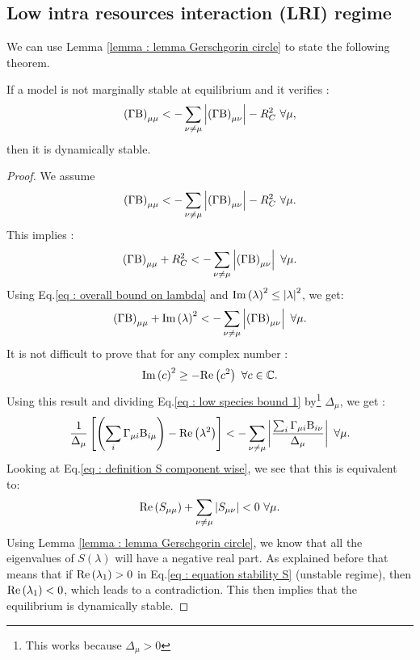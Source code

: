 \documentclass[12pt]{report}
\begin{document}
\subsection{Low intra resources interaction (LRI) regime }
We can use Lemma \ref{lemma : lemma Gerschgorin circle} to state the following theorem.
\begin{theorem}
If a model is not marginally stable at equilibrium and it verifies :
\begin{equation}\label{eq : LRI regime}
\left(\Gamma \text{B}\right)_{\mu\mu} < - \sum_{\nu \neq \mu } \left|{\left(\Gamma \text{B}\right)_{\mu \nu}}\right| - R_C^2 \ \forall \mu,
\end{equation}
then it is dynamically stable.
\end{theorem}
\begin{proof}
We assume
\begin{equation}
\left(\Gamma \text{B}\right)_{\mu\mu} < - \sum_{\nu \neq \mu } \left|{\left(\Gamma \text{B}\right)_{\mu \nu}}\right| -R_C^2 \ \forall \mu.
\end{equation}
This implies :
\begin{equation}
\left(\Gamma \text{B}\right)_{\mu\mu} + R_C^2< - \sum_{\nu \neq \mu } \left|{\left(\Gamma \text{B}\right)_{\mu \nu}}\right| \ \forall \mu.
\end{equation}
Using Eq.\eqref{eq : overall bound on lambda} and $\text{Im}\left(\lambda\right)^2 \leq \left|{\lambda}\right|^2$, we get:
\begin{equation}
  \left(\Gamma\text{B} \right)_{\mu\mu} + \text{Im}\left(\lambda\right)^2 < - \sum_{\nu \neq \mu } \left|{\left(\Gamma \text{B}\right)_{\mu \nu}}\right| \ \forall \mu. \label{eq : low species bound 1}
\end{equation}
It is not difficult to prove that for any complex number :
\begin{equation}
\text{Im}\left(c\right)^2 \geq - \text{Re}\left(c^2\right) \ \forall c \in \mathbb{C}.
\end{equation}
Using this result and dividing Eq.\eqref{eq : low species bound 1} by\footnote{This works because $\Delta_\mu > 0$} $\Delta_\mu$, we get :
\begin{equation}
\frac{1}{\Delta_\mu}\left[\left(\sum_i \Gamma_{\mu i} \text{B}_{i \mu} \right)-\text{Re}\left(\lambda^2\right)\right] < - \sum_{\nu \neq \mu } \left|{\frac{\sum_i \Gamma_{\mu i}\text{B}_{i\nu}}{\Delta_\mu}}\right| \ \forall \mu.
\end{equation}
Looking at Eq.\eqref{eq : definition S component wise}, we see that this is equivalent to:
\begin{equation}
\text{Re}\left(S_{\mu \mu}\right) + \sum_{\nu \neq \mu} \left|{S_{\mu \nu}}\right| < 0\ \forall \mu.
\end{equation}
Using Lemma \ref{lemma : lemma Gerschgorin circle}, we know that all the eigenvalues of $S(\lambda)$ will have a negative real part.
As explained before that means that if $\text{Re}\left(\lambda_1\right) > 0 $ in Eq.\eqref{eq : equation stability S} (unstable regime), then $\text{Re}\left(\lambda_1\right) < 0$, which leads to a contradiction. This then implies that the equilibrium is dynamically stable.
\end{proof}
\end{document}
